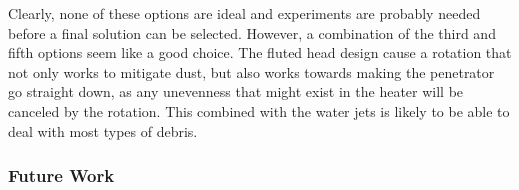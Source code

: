 \noindent
Clearly, none of these options are ideal and experiments are probably needed before a final solution can be selected. However, a combination of the third and fifth options seem like a good choice. The fluted head design cause a rotation that not only works to mitigate dust, but also works towards making the penetrator go straight down, as any unevenness that might exist in the heater will be canceled by the rotation. This combined with the water jets is likely to be able to deal with most types of debris.


\subsubsection{Future Work}